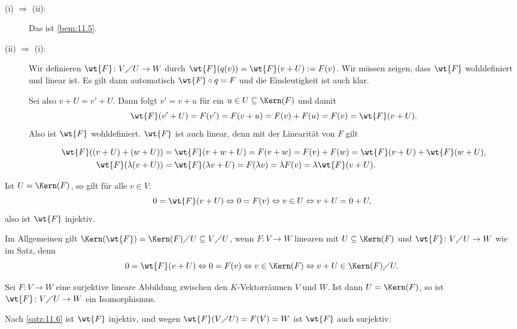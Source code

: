 \begin{beweis}
	\mbox{} \\[-.9cm]
	\begin{description}
		\item[(i) $\Rightarrow$ (ii):] Das ist \autoref{bem:11.5}.
		\item[(ii) $\Rightarrow$ (i):] Wir definieren $\wt{F}\colon V \diagup U \rightarrow W$ durch $\wt{F}(q(v)) = \wt{F}(v+U) := F(v)$.
		Wir müssen zeigen, dass $\wt{F}$ wohldefiniert und linear ist.
		Es gilt dann automatisch $\wt{F} \circ q = F$ und die Eindeutigkeit ist auch klar.
		
		Sei also $v + U = v' + U$.
		Dann folgt $v' = v+u$ für ein $u \in U \subseteq \Kern(F)$ und damit
		\[
			\wt{F}(v'+U) = F(v') = F(v+u) = F(v) + F(u) = F(v) = \wt{F}(v+U).
		\]
		Also ist $\wt{F}$ wohldefiniert.
		$\wt{F}$ ist auch linear, denn mit der Linearität von $F$ gilt
		\newpage
		
		\begin{align*}
			\wt{F}((v+U)+(w+U)) &= \wt{F}(v+w+U) = F(v+w) = F(v) + F(w) = \wt{F}(v+U) + \wt{F}(w+U), \\
			\wt{F}(\lambda(v+U)) &= \wt{F}(\lambda v + U) = F(\lambda v) =\lambda F(v) = \lambda \wt{F}(v+U).		
		\end{align*}
	\end{description}
	Ist $U = \Kern(F)$, so gilt für alle $v \in V$:
	\[
		0 = \wt{F}(v+U) \Leftrightarrow 0 = F(v) \Leftrightarrow v \in U \Leftrightarrow v + U = 0 + U,
	\]
	also ist $\wt{F}$ injektiv. 
\end{beweis}

\begin{bemerkung}
	\label{bem:11.7}
	Im Allgemeinen gilt $\Kern(\wt{F}) = \Kern(F) \diagup U \subseteq V \diagup U$, wenn $F \colon V \rightarrow W$ linearen mit $U \subseteq \Kern(F)$ und $\wt{F}\colon V \diagup U \rightarrow W$ wie im Satz, denn
	\[
		0 = \wt{F}(v+U) \Leftrightarrow 0 = F(v) \Leftrightarrow v \in \Kern(F) \Leftrightarrow v + U \in \Kern(F) \diagup U.
	\]
\end{bemerkung}

\begin{korollar}[Isomorphiesatz]
	\label{kor:11.8}
	Sei $F\colon V \rightarrow W$ eine surjektive lineare Abbildung zwischen den $K$-Vektorräumen $V$ und $W$.
	Ist dann $U = \Kern(F)$, so ist $\wt{F} \colon V \diagup U \rightarrow W$ ein Isomorphismus. 
\end{korollar}

\begin{beweis}
	Nach \autoref{satz:11.6} ist $\wt{F}$ injektiv, und wegen $\wt{F}(V \diagup U) = F(V) = W$ ist $\wt{F}$ auch surjektiv. 
\end{beweis}

